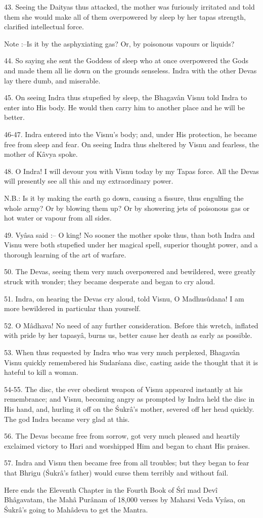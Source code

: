 43. Seeing the Daityas thus attacked, the mother was furiously irritated and told them she would make all of them overpowered by sleep by her tapas strength, clarified intellectual force.

Note :--Is it by the asphyxiating gas? Or, by poisonous vapours or liquids?

44. So saying she sent the Goddess of sleep who at once overpowered the Gods and made them all lie down on the grounds senseless. Indra with the other Devas lay there dumb, and miserable.

45. On seeing Indra thus stupefied by sleep, the Bhagav\^an Visnu told Indra to enter into His body. He would then carry him to another place and he will be better.

46-47. Indra entered into the Visnu's body; and, under His protection, he became free from sleep and fear. On seeing Indra thus sheltered by Visnu and fearless, the mother of K\^avya spoke.

48. O Indra! I will devour you with Visnu today by my Tapas force. All the Devas will presently see all this and my extraordinary power.

N.B.: Is it by making the earth go down, causing a fissure, thus engulfing the whole army? Or by blowing them up? Or by showering jets of poisonous gas or hot water or vapour from all sides.

49. Vy\^asa said :-- O king! No sooner the mother spoke thus, than both Indra and Visnu were both stupefied under her magical spell, superior thought power, and a thorough learning of the art of warfare.

50. The Devas, seeing them very much overpowered and bewildered, were greatly struck with wonder; they became desperate and began to cry aloud.

51. Indra, on hearing the Devas cry aloud, told Visnu, O Madhusûdana! I am more bewildered in particular than yourself.

52. O M\^adhava! No need of any further consideration. Before this wretch, inflated with pride by her tapasy\^a, burns us, better cause her death as early as possible.

53. When thus requested by Indra who was very much perplexed, Bhagav\^an Visnu quickly remembered his Sudar\'sana disc, casting aside the thought that it is hateful to kill a woman.

54-55. The disc, the ever obedient weapon of Visnu appeared instantly at his remembrance; and Visnu, becoming angry as prompted by Indra held the disc in His hand, and, hurling it off on the \'Sukr\^a's mother, severed off her head quickly. The god Indra became very glad at this.

56. The Devas became free from sorrow, got very much pleased and heartily exclaimed victory to Hari and worshipped Him and began to chant His praises.

57. Indra and Visnu then became free from all troubles; but they began to fear that Bhrigu (\'Sukr\^a's father) would curse them terribly and without fail.

Here ends the Eleventh Chapter in the Fourth Book of \'Sr\^i mad Dev\^i Bh\^agavatam, the Mah\^a Pur\^anam of 18,000 verses by Maharsi Veda Vy\^asa, on \'Sukr\^a's going to Mah\^adeva to get the Mantra.